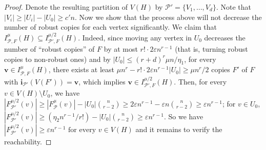 \documentclass[11pt, letterpaper]{amsart}
\theoremstyle{plain}
\numberwithin{equation}{section}
\theoremstyle{definition}
\newcommand\card[1]{\left| #1 \right|}
\newcommand\cardi[1]{| #1 |}
\renewcommand{\vec}[1]{{\mathbf #1}}
\begin{document}
\begin{proof}
Denote the resulting partition of $ V(H) $ by $\mathcal P'= \{V_1,\dots,V_d\} $. 
Note that $ |V_i|\ge |U_i|-|U_0|\ge c'n $. 
Now we show that the process above will not decrease the number of robust copies for each vertex significantly. 
We claim that \(I_{\mathcal{P},F}^{\mu}(H)\subseteq I_{\mathcal{P'},F}^{\mu/2}(H)\).
Indeed, since moving any vertex in $U_0$ decreases the number of ``robust copies'' of $F$ by at most $r!\cdot2\varepsilon{n}^{r-1}$ (that is, turning robust copies to non-robust ones) and by \(\card{U_0}\le (r+d)^{r}\mu n/\eta_1\), for every $\vec{v}\in I_{\mathcal{P},F}^{\mu}(H)$, there exists at least $\mu n^r-r!\cdot2\varepsilon n^{r-1}|U_0|\ge \mu n^r/2 $ copies $F'$ of $F$ with $\vec{i}_{\mathcal{P'}}(V(F'))=\vec{v}$, which implies $\vec{v}\in I_{\mathcal{P'},F}^{\mu/2}(H)$. 
Then, for every $v\in V(H)\setminus U_0$, we have $\cardi{F^{\mu/2}_{\mathcal{P'}}(v)}\ge \cardi{F^{\mu}_{\mathcal{P}}(v)}-|U_0|\binom{n}{r-2}\ge 2\varepsilon n^{r-1}-\varepsilon n\binom{n}{r-2}\ge\varepsilon n^{r-1}$; for $v\in U_0$, $\cardi{F^{\mu/2}_{\mathcal{P'}}(v)}\ge (\eta_2 n^{r-1}/r!)-|U_0|\binom{n}{r-2}\ge \varepsilon n^{r-1}.$
So we have $\cardi{F^{\mu/2}_{\mathcal{P'}}(v)}\ge \varepsilon n^{r-1} \text{ for every } v\in V(H)$
and it remains to verify the reachability.



\end{proof}
\end{document}
